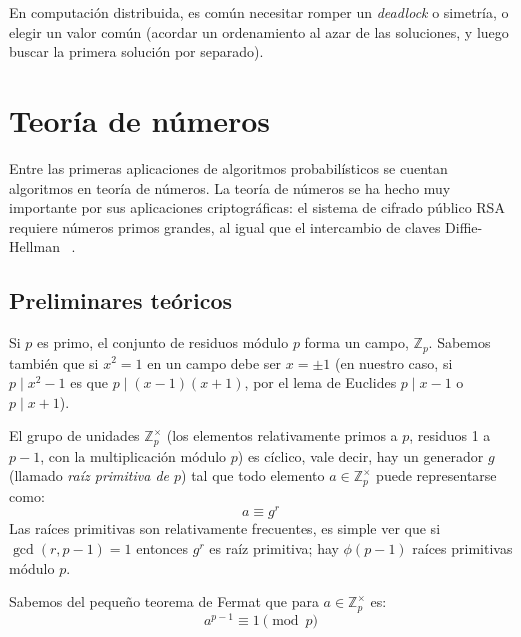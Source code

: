   En computación distribuida,
  es común necesitar romper un \emph{\foreignlanguage{english}{deadlock}}
  o simetría,
  o elegir un valor común
  (acordar un ordenamiento al azar de las soluciones,
   y luego buscar la primera solución por separado).

\section{Teoría de números}
\label{sec:number-theory}

  Entre las primeras aplicaciones de algoritmos probabilísticos
  se cuentan algoritmos en teoría de números.
  La teoría de números se ha hecho muy importante
  por sus aplicaciones criptográficas:
  el sistema de cifrado público RSA~%
    \cite{rivest78:_RSA}
  requiere números primos grandes,
  al igual que el intercambio de claves Diffie-Hellman~%
    \cite{diffie76:_new_directions_cryptography}.

\subsection{Preliminares teóricos}
\label{sec:nt-preliminaries}

  Si \(p\) es primo,
  el conjunto de residuos módulo \(p\) forma un campo,
  \(\mathbb{Z}_p\).
  Sabemos también que si \(x^2 = 1\) en un campo debe ser \(x = \pm 1\)
  (en nuestro caso,
   si \(p \mid x^2 - 1\) es que \(p \mid (x - 1) (x + 1)\),
   por el lema de Euclides
   \(p \mid x - 1\) o \(p \mid x + 1\)).

  El grupo de unidades \(\mathbb{Z}_p^\times\)
  (los elementos relativamente primos a \(p\),
   residuos \num{1} a \(p - 1\),
   con la multiplicación módulo \(p\))
  es cíclico,
  vale decir,
  hay un generador \(g\)
  (llamado \emph{raíz primitiva de \(p\)})
  tal que todo elemento \(a \in \mathbb{Z}_p^\times\) puede representarse como:
  \begin{equation}
    \label{eq:units-powers}
    a
      \equiv g^r
  \end{equation}
  Las raíces primitivas son relativamente frecuentes,
  es simple ver que si \(\gcd(r, p - 1) = 1\)
  entonces \(g^r\) es raíz primitiva;
  hay \(\phi(p - 1)\) raíces primitivas módulo \(p\).

  Sabemos del pequeño teorema de Fermat que para \(a \in \mathbb{Z}_p^\times\)
  es:
  \begin{equation}
    \label{eq:Fermat}
    a^{p - 1}
      \equiv 1 \pmod{p}
  \end{equation}

